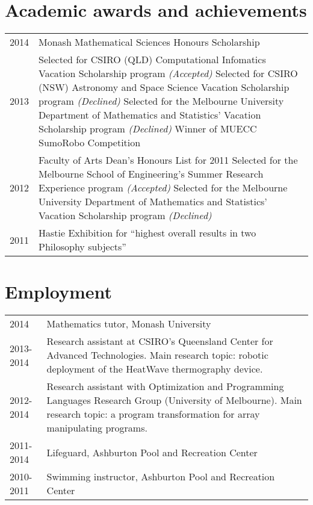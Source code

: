 \documentclass[12pt,a4paper]{article}
\newenvironment{llist}
	{\renewcommand{\arraystretch}{1.5}\begin{tabular}{p{3cm} p{12cm}}}
	{\end{tabular}}
\begin{document}
\section*{Academic awards and achievements}
\begin{llist}
  2014 & Monash Mathematical Sciences Honours Scholarship \\
  2013 & Selected for CSIRO (QLD) Computational Infomatics Vacation Scholarship
         program \textit{(Accepted)} \newline \newline
         Selected for CSIRO (NSW) Astronomy and Space Science Vacation
         Scholarship program \textit{(Declined)}\newline \newline
         Selected for the Melbourne University Department of Mathematics and
         Statistics' Vacation Scholarship program \textit{(Declined)} \newline \newline
         Winner of MUECC SumoRobo Competition \\
	2012 & Faculty of Arts Dean's Honours List for 2011 \newline \newline
         Selected for the Melbourne School of Engineering's Summer Research
         Experience program \textit{(Accepted)} \newline \newline
         Selected for the Melbourne University Department of Mathematics and
         Statistics' Vacation Scholarship program \textit{(Declined)} \\
	2011 & Hastie Exhibition for ``highest overall results in two Philosophy subjects''
\end{llist}

\section*{Employment}
\begin{llist}
  2014 & Mathematics tutor, Monash University \\
  2013-2014 & Research assistant at CSIRO's Queensland Center for Advanced
  Technologies. Main research topic: robotic deployment of the HeatWave
  thermography device. \\
  2012-2014 & Research assistant with Optimization and Programming Languages
  Research Group (University of Melbourne). Main research topic: a program
  transformation for array manipulating programs. \\
	2011-2014 & Lifeguard, Ashburton Pool and Recreation Center \\
	2010-2011 & Swimming instructor, Ashburton Pool and Recreation Center \\
\end{llist}
\end{document}
